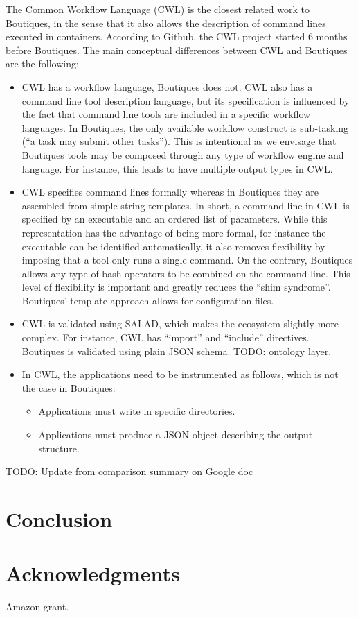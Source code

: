 \documentclass{article}
\newcommand{\todo}[1]{\color{red}TODO: #1\color{black}}
\begin{document}
The Common Workflow Language (CWL) is the closest related work to
Boutiques, in the sense that it also allows the description of command
lines executed in containers. According to Github, the CWL project
started 6 months before Boutiques. The main conceptual differences
between CWL and Boutiques are the following:
\begin{itemize}
\item CWL has a workflow language, Boutiques does not. CWL also has a
  command line tool description language, but its specification is
  influenced by the fact that command line tools are included in a
  specific workflow languages. In Boutiques, the only available
  workflow construct is sub-tasking (``a task may submit other
  tasks''). This is intentional as we envisage that Boutiques tools
  may be composed through any type of workflow engine and language. For instance, this leads to have multiple output types in CWL.
\item CWL specifies command lines formally whereas in Boutiques they
  are assembled from simple string templates. In short, a command line
  in CWL is specified by an executable and an ordered list of
  parameters. While this representation has the advantage of being
  more formal, for instance the executable can be identified
  automatically, it also removes flexibility by imposing that a tool
  only runs a single command. On the contrary, Boutiques allows any
  type of bash operators to be combined on the command line. This
  level of flexibility is important and greatly reduces the ``shim
  syndrome''. Boutiques' template approach allows for configuration files. 
\item CWL is validated using SALAD, which makes the ecosystem slightly
  more complex. For instance, CWL has ``import'' and ``include''
  directives. Boutiques is validated using plain JSON schema. \todo{ontology layer}.
\item In CWL, the applications need to be instrumented as follows, which is not the case in Boutiques:
\begin{itemize}
\item Applications must write in specific directories.
\item Applications must produce a JSON object describing the output structure.
\end{itemize}
\end{itemize}

\todo{Update from comparison summary on Google doc}


\section{Conclusion}

\section{Acknowledgments}

Amazon grant.



\end{document}
